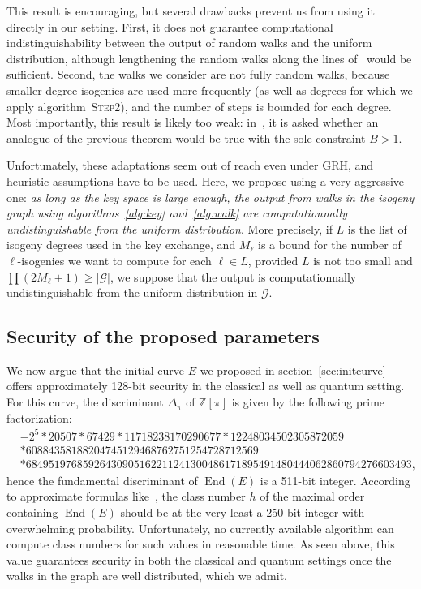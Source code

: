 \documentclass{article}
\newcommand{\Z}{\mathbb{Z}}
\newcommand{\Graph}{\mathcal{G}}
\newcommand{\algstyle}[1]{\textsc{#1}}
\theoremstyle{definition}
\DeclareMathOperator{\End}{End}
\begin{document}
This result is encouraging, but several drawbacks prevent us from
using it directly in our setting. First, it does not guarantee
computational indistinguishability between the output of random
walks and the uniform distribution, although lengthening the
random walks along the lines of~\cite[Theorem ...]{todo:expanders}
would be sufficient. Second, the walks we consider are not fully random
walks, because smaller degree isogenies are used more frequently
(as well as degrees for which we apply algorithm~\algstyle{Step2}),
and the number of steps is bounded for each degree. Most
importantly, this result is likely too weak: in~\cite[7.2]{jao+miller+venkatesan09},
it is asked whether an analogue of the previous theorem would
be true with the sole constraint $B>1$.

Unfortunately, these adaptations seem out of reach even under
GRH, and heuristic assumptions have to be used. Here, we propose using
a very aggressive one: \emph{as long as the key space is large
enough, the output from walks in the isogeny graph using algorithms~\ref{alg:key}
and~\ref{alg:walk} are computationnally undistinguishable from the uniform
distribution}. More precisely, if $L$ is the list of isogeny degrees used
in the key exchange, and $M_\ell$ is a bound for the number of $\ell$-isogenies
we want to compute for each $\ell\in L$, provided $L$ is not too small
and $\prod (2 M_\ell + 1) \geq |\Graph|$, we suppose that
the output is computationnally
undistinguishable from the uniform distribution in $\Graph$.

\subsection{Security of the proposed parameters}

We now argue that the initial curve $E$ we proposed in section~\ref{sec:initcurve}
offers approximately 128-bit security in the classical as well as quantum
setting. For this curve, the discriminant $\Delta_\pi$ of $\Z[\pi]$ is
given by the following prime factorization:
\[
\begin{aligned}
& -2^5 * 20507 * 67429 * 11718238170290677 * 12248034502305872059 \\
& * 60884358188204745129468762751254728712569\\
& * 68495197685926430905162211241300486171895491480444062860794276603493,
\end{aligned}
\]
hence the fundamental discriminant of $\End(E)$ is a 511-bit integer.
According to approximate formulas like~\cite{todo:classnumbers},
the class number $h$ of the maximal order containing $\End(E)$ should
be at the very least a 250-bit integer with overwhelming
probability. Unfortunately,
no currently available algorithm can compute class numbers for such values
in reasonable time. As seen above, this value guarantees security
in both the classical and quantum settings once the walks in
the graph are well distributed, which we admit.
\end{document}
